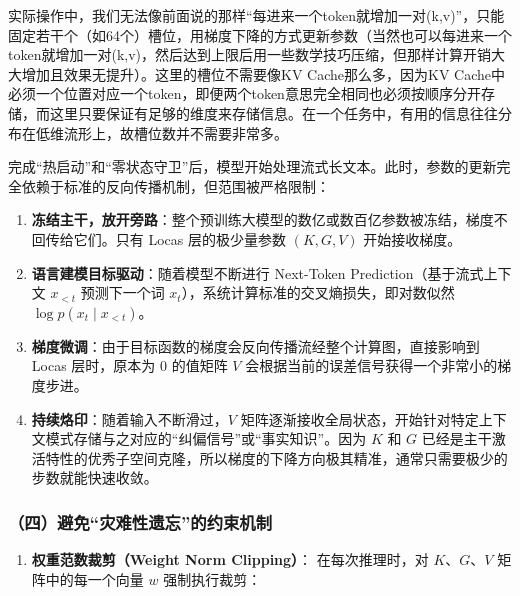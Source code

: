 实际操作中，我们无法像前面说的那样``每进来一个token就增加一对(k,v)''，只能固定若干个（如64个）槽位，用梯度下降的方式更新参数（当然也可以每进来一个token就增加一对(k,v)，然后达到上限后用一些数学技巧压缩，但那样计算开销大大增加且效果无提升）。这里的槽位不需要像KV Cache那么多，因为KV Cache中必须一个位置对应一个token，即便两个token意思完全相同也必须按顺序分开存储，而这里只要保证有足够的维度来存储信息。在一个任务中，有用的信息往往分布在低维流形上，故槽位数并不需要非常多。

完成``热启动''和``零状态守卫''后，模型开始处理流式长文本。此时，参数的更新完全依赖于标准的反向传播机制，但范围被严格限制：

\begin{enumerate}
\def\labelenumi{\arabic{enumi}.}
\tightlist
\item
  \textbf{冻结主干，放开旁路}：整个预训练大模型的数亿或数百亿参数被冻结，梯度不回传给它们。只有 Locas 层的极少量参数 \((K,G,V)\) 开始接收梯度。
\item
  \textbf{语言建模目标驱动}：随着模型不断进行 Next-Token Prediction（基于流式上下文 \(x_{<t}\) 预测下一个词 \(x_t\)），系统计算标准的交叉熵损失，即对数似然 \(\log p(x_t\mid x_{<t})\)。
\item
  \textbf{梯度微调}：由于目标函数的梯度会反向传播流经整个计算图，直接影响到 Locas 层时，原本为 \(0\) 的值矩阵 \(V\) 会根据当前的误差信号获得一个非常小的梯度步进。
\item
  \textbf{持续烙印}：随着输入不断滑过，\(V\) 矩阵逐渐接收全局状态，开始针对特定上下文模式存储与之对应的``纠偏信号''或``事实知识''。因为 \(K\) 和 \(G\) 已经是主干激活特性的优秀子空间克隆，所以梯度的下降方向极其精准，通常只需要极少的步数就能快速收敛。
\end{enumerate}

\hypertarget{ux56dbux907fux514dux707eux96beux6027ux9057ux5fd8ux7684ux7ea6ux675fux673aux5236}{%
\subsubsection{（四）避免``灾难性遗忘''的约束机制}\label{ux56dbux907fux514dux707eux96beux6027ux9057ux5fd8ux7684ux7ea6ux675fux673aux5236}}

\begin{enumerate}
\def\labelenumi{\arabic{enumi}.}
\tightlist
\item
  \textbf{权重范数裁剪（Weight Norm Clipping）}：
  在每次推理时，对 \(K\)、\(G\)、\(V\) 矩阵中的每一个向量 \(w\) 强制执行裁剪：
\end{enumerate}

